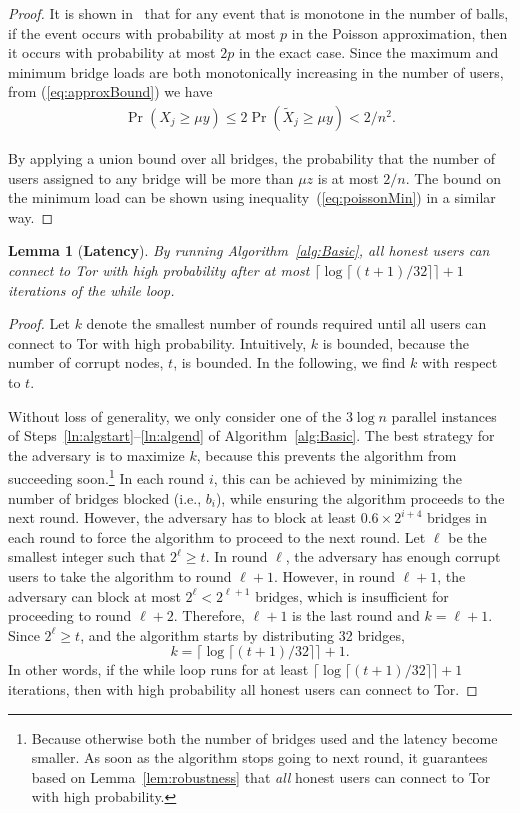 \documentclass[letterpaper,twocolumn,10pt]{article}
\newcommand{\ie}{i.e.}
\newtheorem{lemma}{Lemma}
\newcommand{\sfsize}{\fontsize{0.68\baselineskip}{0.68\baselineskip}\selectfont}
\newcommand{\sans}[1]{\textbf{\textsf{\sfsize \mbox{#1}}}}
\begin{document}
\begin{proof}
	It is shown in~\cite[Corollary 5.11]{Michael2005} that for any event that is monotone in the number of balls, if the event occurs with probability at most $p$ in the Poisson approximation, then it occurs with probability at most $2p$ in the exact case. Since the maximum and minimum bridge loads are both monotonically increasing in the number of users, from (\ref{eq:approxBound}) we have
	\begin{align*}
	\Pr(X_j \geq \mu y) \leq 2\Pr(\tilde{X}_j \geq \mu y) < 2/n^2.
	\end{align*}
	
	By applying a union bound over all bridges, the probability that the number of users assigned to any bridge will be more than $\mu z$ is at most $2/n$. The bound on the minimum load can be shown using inequality~(\ref{eq:poissonMin}) in a similar way.
\end{proof}

\begin{lemma}[\sans{Latency}] \label{lem:NumIterationsBasic}
	By running Algorithm~\ref{alg:Basic}, all honest users can connect to Tor with high probability after at most ${\lceil \log{\lceil (t+1)/32 \rceil} \rceil + 1}$ iterations of the while loop.
\end{lemma}
\begin{proof}
	Let $k$ denote the smallest number of rounds required until all users can connect to Tor with high probability. Intuitively, $k$ is  bounded, because the number of corrupt nodes, $t$, is bounded. In the following, we find $k$ with respect to $t$. 
	
	Without loss of generality, we only consider one of the $3\log{n}$ parallel instances of Steps~\ref{ln:algstart}--\ref{ln:algend} of Algorithm~\ref{alg:Basic}. The best strategy for the adversary is to maximize $k$, because this prevents the algorithm from succeeding soon.\footnote{Because otherwise both the number of bridges used and the latency become smaller. As soon as the algorithm stops going to next round, it guarantees based on Lemma~\ref{lem:robustness} that \emph{all} honest users can connect to Tor with high probability.} In each round $i$, this can be achieved by minimizing the number of bridges blocked (\ie, $b_i$), while ensuring the algorithm proceeds to the next round. However, the adversary has to block at least ${0.6 \times 2^{i+4}}$ bridges in each round to force the algorithm to proceed to the next round. Let $\ell$ be the smallest integer such that ${2^\ell \geq t}$. In round $\ell$, the adversary has enough corrupt users to take the algorithm to round ${\ell + 1}$. However, in round ${{\ell + 1}}$, the adversary can block at most ${2^\ell < 2^{\ell+1}}$ bridges, which is insufficient for proceeding to round ${\ell + 2}$. Therefore, ${\ell + 1}$ is the last round and ${k = \ell + 1}$. Since ${2^\ell \geq t}$, and the algorithm starts by distributing 32 bridges, 
	\[k = \lceil \log{\lceil (t+1)/32 \rceil} \rceil + 1.\] 
	In other words, if the while loop runs for at least ${\lceil \log{\lceil (t+1)/32 \rceil} \rceil + 1}$ iterations, then with high probability all honest users can connect to Tor.
\end{proof}
\end{document}
